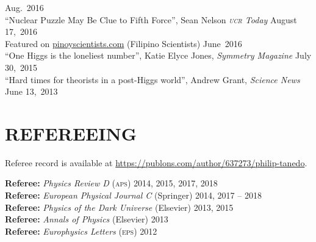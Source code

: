 \documentclass[margin,line]{resume}
\newcommand{\scap}[1]{\textsc{\MakeLowercase{#1}}}
\begin{document}
\begin{resume}
	\hfill Aug.~2016\vspace{.7mm}\\   
``Nuclear Puzzle May Be Clue to Fifth Force'', Sean Nelson \emph{\scap{UCR} Today}
\hfill August 17,~2016\vspace{.7mm}\\   
%
Featured on \url{pinoyscientists.com} (Filipino Scientists)
\hfill June~2016\vspace{.7mm}\\   
%
%
``One Higgs is the loneliest number'', Katie Elyce Jones, \emph{Symmetry Magazine}
\hfill July 30,~2015\vspace{.7mm}\\   
%
``Hard times for theorists in a post-Higgs world'', Andrew Grant, \emph{Science News}
\hfill June 13,~2013\vspace{.7mm}%






\section{\footnotesize \sc
\sffamily 
{}REFEREEING
}


Referee record is available at \url{https://publons.com/author/637273/philip-tanedo}.

\textbf{Referee:} \emph{Physics Review D} (\scap{APS})
\hfill 2014, 2015, 2017, 2018\vspace{.3mm}\\
%
\textbf{Referee:} \emph{European Physical Journal C} (Springer)
\hfill 2014, 2017 -- 2018\vspace{.3mm}\\
%
\textbf{Referee:} \emph{Physics of the Dark Universe} (Elsevier)
\hfill 2013, 2015\vspace{.3mm}\\
%
\textbf{Referee:}  \emph{Annals of Physics} (Elsevier)
\hfill 2013\vspace{.3mm}\\
%
\textbf{Referee:} \emph{Europhysics Letters} (\scap{EPS})
\hfill 2012\vspace{.3mm}%





\end{resume}
\end{document}
